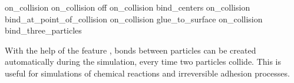 \begin{essyntax}
 on\_collision
 on\_collision off
 on\_collision  bind_centers  
 on\_collision  bind_at_point_of_collision    
 on\_collision  glue_to_surface        
 on\_collision  bind_three_particles    
\end{essyntax}

With the help of the feature , bonds
between particles can be created automatically during the simulation,
every time two particles collide. This is useful for simulations of
chemical reactions and irreversible adhesion processes.

